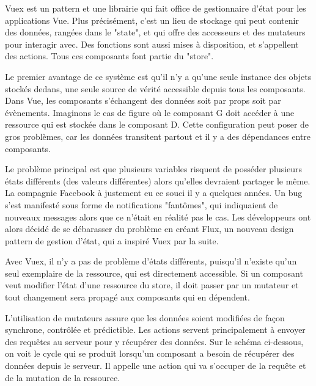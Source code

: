 \documentclass[
    iai, %
    eai, %
]{heig-tb}
\begin{document}
Vuex est un pattern et une librairie qui fait office de gestionnaire d'état pour les applications Vue.
Plus précisément, c'est un lieu de stockage qui peut contenir des données, rangées dans le "state", et qui offre des accesseurs et des mutateurs pour interagir avec.
Des fonctions sont aussi mises à disposition, et s'appellent des actions. Tous ces composants font partie du "store".

Le premier avantage de ce système est qu'il n'y a qu'une seule instance des objets stockés dedans, une seule source de vérité accessible depuis tous les composants.
Dans Vue, les composants s'échangent des données soit par props soit par évènements.
Imaginons le cas de figure où le composant G doit accéder à une ressource qui est stockée dans le composant D.
Cette configuration peut poser de gros problèmes, car les données transitent partout et il y a des dépendances entre composants.

\newpage
{}

Le problème principal est que plusieurs variables risquent de posséder plusieurs états différents (des valeurs différentes) alors qu'elles devraient partager le même.
La compagnie Facebook à justement eu ce souci il y a quelques années.
Un bug s'est manifesté sous forme de notifications "fantômes", qui indiquaient de nouveaux messages alors que ce n'était en réalité pas le cas.
Les développeurs ont alors décidé de se débarasser du problème en créant Flux, un nouveau design pattern de gestion d'état, qui a inspiré Vuex par la suite.


Avec Vuex, il n'y a pas de problème d'états différents, puisqu'il n'existe qu'un seul exemplaire de la ressource, qui est directement accessible.
Si un composant veut modifier l'état d'une ressource du store, il doit passer par un mutateur et tout changement sera propagé aux composants qui en dépendent.

\newpage
L'utilisation de mutateurs assure que les données soient modifiées de façon synchrone, contrôlée et prédictible.
Les actions servent principalement à envoyer des requêtes au serveur pour y récupérer des données.
Sur le schéma ci-dessous, on voit le cycle qui se produit lorsqu'un composant a besoin de récupérer des données depuis le serveur.
Il appelle une action qui va s'occuper de la requête et de la mutation de la ressource.

\end{document}
